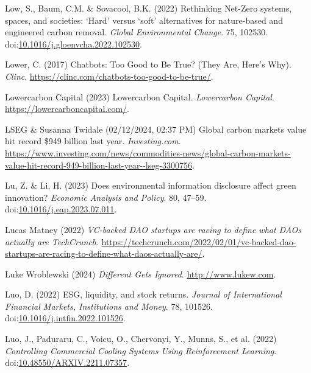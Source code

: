\documentclass[
  letterpaper,
  DIV=11,
  numbers=noendperiod]{scrartcl}
\newlength{\cslhangindent}
\newenvironment{CSLReferences}[2] %
 {\begin{list}{}{%
  \setlength{\itemindent}{0pt}
  \setlength{\leftmargin}{0pt}
  \setlength{\parsep}{0pt}
  \ifodd #1
   \setlength{\leftmargin}{\cslhangindent}
   \setlength{\itemindent}{-1\cslhangindent}
  \fi
  \setlength{\itemsep}{#2\baselineskip}}}
 {\end{list}}
\begin{document}
\begin{CSLReferences}{0}{1}
Low, S., Baum, C.M. \& Sovacool, B.K. (2022) Rethinking {Net-Zero}
systems, spaces, and societies: {`{Hard}'} versus {`soft'} alternatives
for nature-based and engineered carbon removal. \emph{Global
Environmental Change}. 75, 102530.
doi:\href{https://doi.org/10.1016/j.gloenvcha.2022.102530}{10.1016/j.gloenvcha.2022.102530}.

Lower, C. (2017) Chatbots: {Too Good} to {Be True}? ({They Are},
{Here}'s {Why}). \emph{Clinc}.
\url{https://clinc.com/chatbots-too-good-to-be-true/}.

Lowercarbon Capital (2023) Lowercarbon {Capital}. \emph{Lowercarbon
Capital}. \url{https://lowercarboncapital.com/}.

LSEG \& Susanna Twidale (02/12/2024, 02:37 PM) Global carbon markets
value hit record \$949 billion last year. \emph{Investing.com}.
\url{https://www.investing.com/news/commodities-news/global-carbon-markets-value-hit-record-949-billion-last-year--lseg-3300756}.

Lu, Z. \& Li, H. (2023) Does environmental information disclosure affect
green innovation? \emph{Economic Analysis and Policy}. 80, 47--59.
doi:\href{https://doi.org/10.1016/j.eap.2023.07.011}{10.1016/j.eap.2023.07.011}.

Lucas Matney (2022) \emph{{VC-backed DAO} startups are racing to define
what {DAOs} actually are {\textbar} {TechCrunch}}.
\url{https://techcrunch.com/2022/02/01/vc-backed-dao-startups-are-racing-to-define-what-daos-actually-are/}.

Luke Wroblewski (2024) \emph{Different {Gets Ignored}}.
\url{http://www.lukew.com}.

Luo, D. (2022) {ESG}, liquidity, and stock returns. \emph{Journal of
International Financial Markets, Institutions and Money}. 78, 101526.
doi:\href{https://doi.org/10.1016/j.intfin.2022.101526}{10.1016/j.intfin.2022.101526}.

Luo, J., Paduraru, C., Voicu, O., Chervonyi, Y., Munns, S., et al.
(2022) \emph{Controlling {Commercial Cooling Systems Using Reinforcement
Learning}}.
doi:\href{https://doi.org/10.48550/ARXIV.2211.07357}{10.48550/ARXIV.2211.07357}.


\end{CSLReferences}
\end{document}
